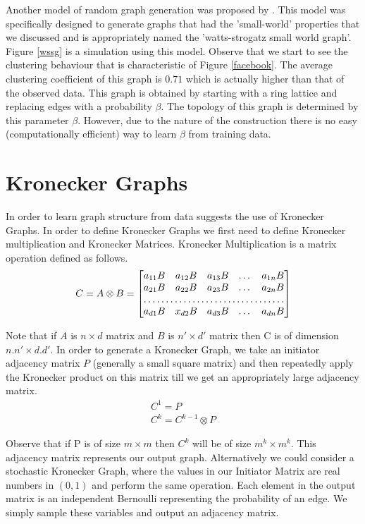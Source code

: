 \documentclass[dvips,12pt]{article}
\begin{document}
Another model of random graph generation was proposed by \cite{watts1998}. This model was specifically designed to generate graphs that had the 'small-world' properties that we discussed and is appropriately named the 'watts-strogatz small world graph'. Figure \ref{wssg} is a simulation using this model. Observe that we start to see the clustering behaviour that is characteristic of Figure \ref{facebook}. The average clustering coefficient of this graph is $0.71$ which is actually higher than that of the observed data. This graph is obtained by starting with a ring lattice and replacing edges with a probability $\beta$.  The topology of this graph is determined by this parameter $\beta$. However, due to the nature of the construction there is no easy (computationally efficient) way to learn $\beta$ from training data. 

\section{Kronecker Graphs}

In order to learn graph structure from data \cite{ghahramani2010} suggests the use of Kronecker Graphs. In order to define Kronecker Graphs we first need to define Kronecker multiplication and Kronecker Matrices. Kronecker Multiplication is a matrix operation defined as follows. 
\[
C = A \otimes B = 
\begin{bmatrix}
    a_{11}B       & a_{12}B & a_{13}B & \dots & a_{1n}B \\
    a_{21}B     & a_{22}B & a_{23}B & \dots & a_{2n}B \\
    \hdotsfor{5} \\
    a_{d1}B       & x_{d2}B & a_{d3}B & \dots & a_{dn}B
\end{bmatrix}
\]

Note that if $A$ is $n \times d$ matrix and $B$ is $n' \times d'$ matrix then C is of dimension $n.n' \times d.d'$. In order to generate a Kronecker Graph, we take an initiator adjacency matrix $P$ (generally a small square matrix) and then repeatedly apply the Kronecker product on this matrix till we get an appropriately large adjacency matrix.
\begin{gather}
  C^1 = P \\
  C^k = C^{k-1} \otimes P
\end{gather}

Observe that if P is of size $m \times m$ then $C^k$ will be of size $m^k \times m^k$. This adjacency matrix represents our output graph. Alternatively we could consider a stochastic Kronecker Graph, where the values in our Initiator Matrix are real numbers in $(0,1)$ and perform the same operation. Each element in the output matrix is an independent Bernoulli representing the probability of an edge. We simply sample these variables and output an adjacency matrix.
\end{document}
